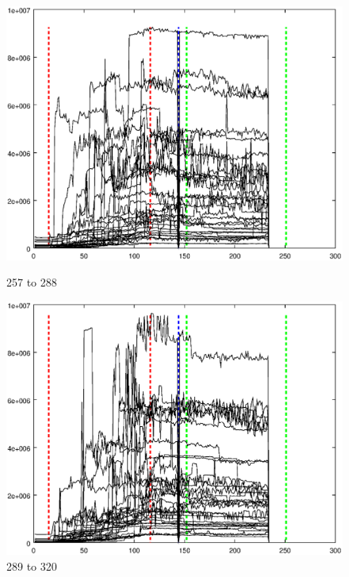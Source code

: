 \documentclass{article}
\begin{document}
\begin{figure}[h]
\centering
\begin{minipage}{.49\textwidth}
	\centering
	\includegraphics[width=0.79\linewidth]{measurement/spad_257-288}
	\caption{257 to 288}
	\label{fig:spad_257-288}
\end{minipage}
\begin{minipage}{.49\textwidth}
	\centering
	\includegraphics[width=0.79\linewidth]{measurement/spad_289-320}
	\caption{289 to 320}
	\label{fig:spad_289-320}
\end{minipage}
\end{figure}
\end{document}
